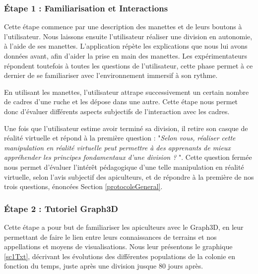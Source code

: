 		\subsubsection{Étape 1 : Familiarisation et Interactions}
		Cette étape commence par une description des manettes et de leurs boutons à l'utilisateur. Nous laissons ensuite l'utilisateur réaliser une division en autonomie, à l'aide de ses manettes. L'application répète les explications que nous lui avons données avant, afin d'aider la prise en main des manettes. Les expérimentateurs répondent toutefois à toutes les questions de l'utilisateur, cette phase permet à ce dernier de se familiariser avec l'environnement immersif à son rythme.
		
		En utilisant les manettes, l'utilisateur attrape successivement un certain nombre de cadres d'une ruche et les dépose dans une autre. Cette étape nous permet donc d'évaluer différents aspects subjectifs de l'interaction avec les cadres.
		
		Une fois que l'utilisateur estime avoir terminé sa division, il retire son casque de réalité virtuelle et répond à la première question : "\textit{Selon vous, réaliser cette manipulation en réalité virtuelle peut permettre à des apprenants de mieux appréhender les principes fondamentaux d'une division ? }". Cette question fermée nous permet d'évaluer l'intérêt pédagogique d'une telle manipulation en réalité virtuelle, selon l'avis subjectif des apiculteurs, et de répondre à la première de nos trois questions, énoncées Section \ref{protocoleGeneral}.
		
		\subsubsection{Étape 2 : Tutoriel Graph3D}
		Cette étape a pour but de familiariser les apiculteurs avec le Graph3D, en leur permettant de faire le lien entre leurs connaissances de terrains et nos appellations et moyens de visualisations. Nous leur présentons le graphique \ref{sc1Txt}, décrivant les évolutions des différentes populations de la colonie en fonction du temps, juste après une division jusque 80 jours après.
		
